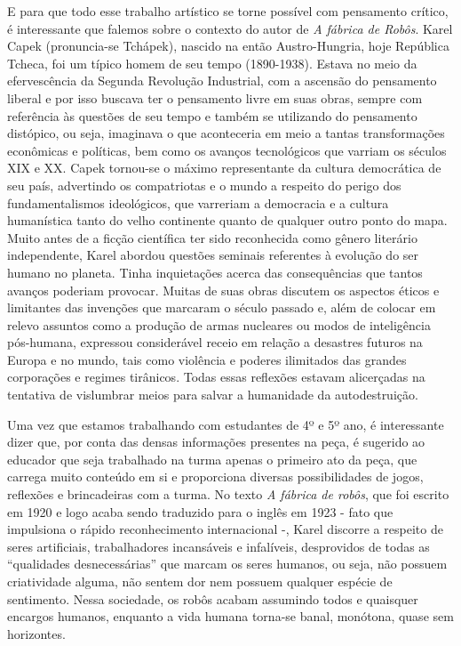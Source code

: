 \documentclass[11pt]{extarticle}
\begin{document}
E para que todo esse trabalho artístico se torne possível com pensamento crítico, é interessante que falemos sobre o contexto do autor de \textit{A fábrica de Robôs}. Karel Capek (pronuncia-se Tchápek), nascido na então Austro-Hungria, hoje República Tcheca, foi um típico homem de seu tempo (1890-1938). Estava no meio da efervescência da Segunda Revolução Industrial, com a ascensão do pensamento liberal e por isso buscava ter o pensamento livre em suas obras, sempre com referência às questões de seu tempo e também se utilizando do pensamento distópico, ou seja, imaginava o que aconteceria em meio a tantas transformações econômicas e políticas, bem como os avanços tecnológicos que varriam os séculos XIX e XX. Capek tornou-se o máximo representante da cultura democrática de seu país, advertindo os compatriotas e o mundo a respeito do perigo dos fundamentalismos ideológicos, que varreriam a democracia e a cultura humanística tanto do velho continente quanto de qualquer outro ponto do mapa. Muito antes de a ficção científica ter sido reconhecida como gênero literário independente, Karel abordou questões seminais referentes à evolução do ser humano no planeta. Tinha inquietações acerca das consequências que tantos avanços poderiam provocar. Muitas de suas obras discutem os aspectos éticos e limitantes das invenções que marcaram o século passado e, além de colocar em relevo assuntos como a produção de armas nucleares ou modos de inteligência pós-humana, expressou considerável receio em relação a desastres futuros na Europa e no mundo, tais como violência e poderes ilimitados das grandes corporações e regimes tirânicos. Todas essas reflexões estavam alicerçadas na tentativa de vislumbrar meios para salvar a humanidade da autodestruição. 


Uma vez que estamos trabalhando com estudantes de 4º e 5º ano, é interessante dizer que, por conta das densas informações presentes na peça, é sugerido ao educador que seja trabalhado na turma apenas o primeiro ato da peça, que carrega muito conteúdo em si e proporciona diversas possibilidades de jogos, reflexões e brincadeiras com a turma. No texto \textit{A fábrica de robôs}, que foi escrito em 1920 e logo acaba sendo traduzido para o inglês em 1923 - fato que impulsiona o rápido reconhecimento internacional  -, Karel discorre a respeito de seres artificiais, trabalhadores incansáveis e infalíveis, desprovidos de todas as “qualidades desnecessárias” que marcam os seres humanos, ou seja, não possuem criatividade alguma, não sentem dor nem possuem qualquer espécie de sentimento. Nessa sociedade, os robôs acabam assumindo todos e quaisquer encargos humanos, enquanto a vida humana torna-se banal, monótona, quase sem horizontes.
\end{document}
